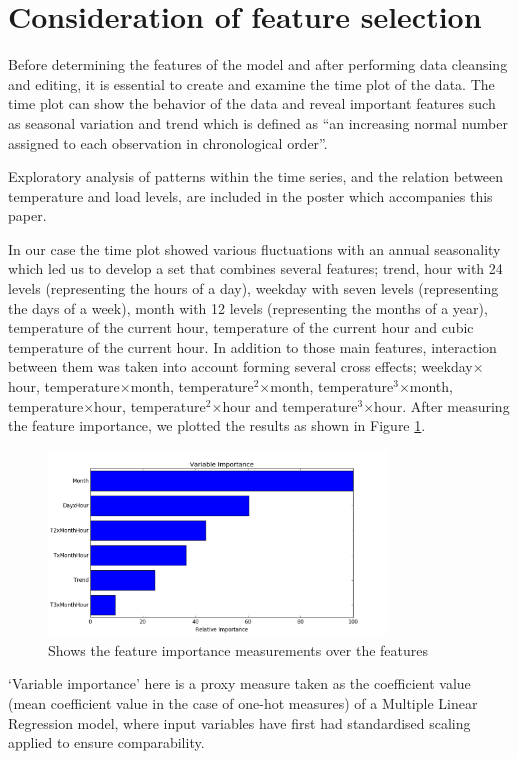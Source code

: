 \documentclass{article} %
\begin{document}
\section*{Consideration of feature selection}
Before determining the features of the model and after performing data cleansing and editing, it is essential to create and examine the time plot of the data. The time plot can show the behavior of the data and reveal important features such as seasonal variation and trend which is defined as “an increasing normal number assigned to each observation in chronological order”.

Exploratory analysis of patterns within the time series, and the relation between temperature and load levels, are included in the poster which accompanies this paper.

In our case the time plot showed various fluctuations with an annual seasonality which led us to develop a set that combines several features; trend, hour with 24 levels (representing the hours of a day), weekday with seven levels (representing the days of a week), month with 12 levels (representing the months of a year), temperature of the current hour, temperature of the current hour and cubic temperature of the current hour. In addition to those main features, interaction between them was taken into account forming several cross effects; weekday$\times$hour, temperature$\times$month, temperature$^2$$\times$month, temperature$^3$$\times$month, temperature$\times$hour, temperature$^2$$\times$hour and temperature$^3$$\times$hour. After measuring the feature importance, we plotted the results as shown in Figure \ref{fig:var_imp}.
\begin{figure}[H]
  \centering
    \includegraphics[width=0.80\textwidth]{variable_importance}
  \caption{Shows the feature importance measurements over the features}
  \label{fig:var_imp}
\end{figure}

`Variable importance' here is a proxy measure taken as the coefficient value (mean coefficient value in the case of one-hot measures) of a Multiple Linear Regression model, where input variables have first had standardised scaling applied to ensure comparability.
\end{document}
